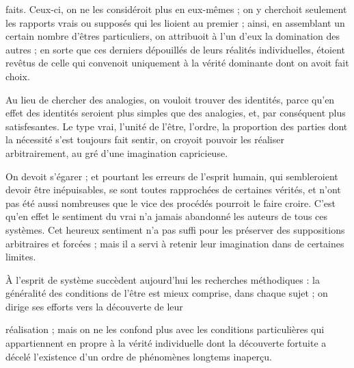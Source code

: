 \documentclass[11pt,a4paper]{article}
\begin{document}
faits. Ceux-ci, on ne les considéroit plus en eux-mêmes ; on y cherchoit
seulement  les rapports vrais ou supposés qui les lioient au
premier ; ainsi, en assemblant un certain nombre d'êtres particuliers, on
attribuoit à l'un d'eux la domination des autres ; en sorte que ces
derniers  dépouillés de leurs réalités individuelles,
 étoient revêtus de celle qui convenoit uniquement à la
vérité dominante dont on avoit fait
choix.

 Au lieu de chercher des analogies, on vouloit trouver des
identités, parce qu'en effet des identités seroient plus simples que des
analogies, et, par conséquent  plus
satisfesantes. Le type
 vrai, l'unité de l'être, l'ordre, la proportion des parties
dont la nécessité s'est toujours fait sentir, on croyoit pouvoir les
réaliser arbitrairement, au gré d'une imagination capricieuse.

On devoit s'égarer ; et pourtant les erreurs de l'esprit humain, qui
sembleroient devoir être inépuisables, se sont toutes rapprochées de
certaines vérités, et n'ont pas été aussi nombreuses que le vice des
procédés pourroit le faire croire. C'est qu'en effet le sentiment du vrai
n'a jamais abandonné les auteurs de tous ces systèmes. Cet heureux
sentiment n'a pas suffi pour les préserver des suppositions arbitraires et
forcées ; mais  il a servi à 
retenir leur imagination dans de certaines limites.

À l'esprit de système succèdent aujourd'hui 
les recherches méthodiques : la généralité des conditions de l'être est
mieux comprise, dans chaque sujet ; on dirige ses efforts vers la découverte
de leur

réalisation ; mais on ne les confond plus avec  les
conditions particulières qui appartiennent en propre à la vérité individuelle  dont la découverte fortuite a décelé l'existence d'un ordre
de phénomènes longtems inaperçu.
\end{document}
